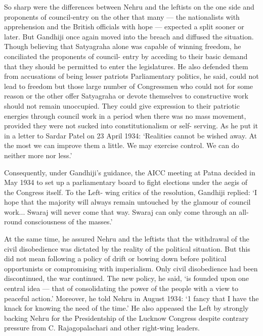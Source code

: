 So sharp were the differences between Nehru and the leftists on the one side and proponents of council-entry on the other that many --- the nationalists with apprehension and the British officials with hope --- expected a split sooner or later. But Gandhiji once again moved into the breach and diffused the situation. Though believing that Satyagraha alone was capable of winning freedom, he conciliated the proponents of council- entry by acceding to their basic demand that they should be permitted to enter the legislatures. He also defended them from accusations of being lesser patriots Parliamentary politics, he said, could not lead to freedom but those large number of Congressmen who could not for some reason or the other offer Satyagraha or devote themselves to constructive work should not remain unoccupied. They could give expression to their patriotic energies through council work in a period when there was no mass movement, provided they were not sucked into constitutionalism or self- serving. As he put it in a letter to Sardar Patel on 23 April 1934: `Realities cannot be wished away. At the most we can improve them a little. We may exercise control. We can do neither more nor less.' 

Consequently, under Gandhiji's guidance, the AICC meeting at Patna decided in May 1934 to set up a parliamentary board to fight elections under the aegis of the Congress itself. To the Left- wing critics of the resolution, Gandhiji replied: `I hope that the majority will always remain untouched by the glamour of council work... Swaraj will never come that way. Swaraj can only come through an all-round consciousness of the masses.' 

At the same time, he assured Nehru and the leftists that the withdrawal of the civil disobedience was dictated by the reality of the political situation. But this did not mean following a policy of drift or bowing down before political opportunists or compromising with imperialism. Only civil disobedience had been discontinued, the war continued. The new policy, he said, `is founded upon one central idea --- that of consolidating the power of the people with a view to peaceful action.' Moreover, he told Nehru in August 1934: `1 fancy that I have the knack for knowing the need of the time.' He also appeased the Left by strongly backing Nehru for the Presidentship of the Lucknow Congress despite contrary pressure from C. Rajagopalachari and other right-wing leaders. 

